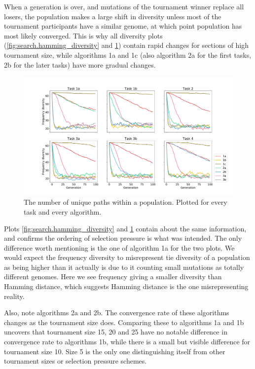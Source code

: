 When a generation is over, and mutations of the tournament winner replace all losers, the population makes a large shift in diversity unless most of the tournament participants have a similar genome, at which point population has most likely converged. This is why all diversity plots (\ref{fig:search.hamming_diversity} and \ref{fig:search.frequency_diversity_unique}) contain rapid changes for sections of high tournament size, while algorithms 1a and 1c (also algorithm 2a for the first tasks, 2b for the later tasks) have more gradual changes. 

\begin{figure}
    \includegraphics[width=1.2\textwidth,center]{Chapters/4.Experiments/exp2/figures/inuse/frequency_diversity_unique_path_count.pdf}
    \caption[Unique genome frequency diversity]{The number of unique paths within a population. Plotted for every task and every algorithm.}
    \label{fig:search.frequency_diversity_unique}
\end{figure}

Plots \ref{fig:search.hamming_diversity} and \ref{fig:search.frequency_diversity_unique} contain about the same information, and confirms the ordering of selection pressure is what was intended. The only difference worth mentioning is the one of algorithm 1a for the two plots. We would expect the frequency diversity to misrepresent tie diversity of a population as being higher than it actually is due to it counting small mutations as totally different genomes. Here we see frequency giving a smaller diversity than Hamming distance, which suggests Hamming distance is the one misrepresenting reality. 

Also, note algorithms 2a and 2b. The convergence rate of these algorithms changes as the tournament size does. Comparing these to algorithms 1a and 1b uncovers that tournament size 15, 20 and 25 have no notable difference in convergence rate to algorithms 1b, while there is a small but visible difference for tournament size 10. Size 5 is the only one distinguishing itself from other tournament sizes or selection pressure schemes. 

